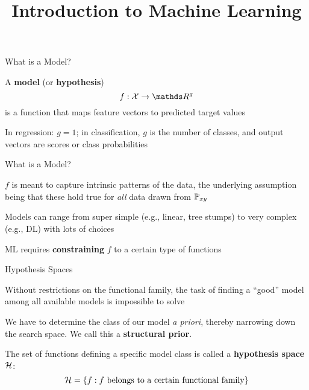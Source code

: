 \documentclass[11pt,compress,t,notes=noshow, xcolor=table]{beamer}
\title{Introduction to Machine Learning}
\begin{document}


\begin{framei}{What is a Model?}
\item A \textbf{model} (or \textbf{hypothesis}) 
$$
f : \Xspace \rightarrow \R^g
$$ 
is a function that maps feature vectors to predicted target values
\item In regression: $g = 1$; in classification, $g$ is the number of classes, and output vectors are scores or class probabilities
\end{framei}


\begin{framei}{What is a Model?}
\item $f$ is meant to capture intrinsic patterns of the data, the underlying assumption being that these hold true for \emph{all} data drawn from $\mathbb{P}_{xy}$
\item Models can range from super simple (e.g., linear, tree stumps) to very complex (e.g., DL) with lots of choices
\vfill
{}
\item ML requires \textbf{constraining} $f$ to a certain type of functions
\end{framei}


\begin{framei}[sep=L]{Hypothesis Spaces}
\item Without restrictions on the functional family, the task of finding a \enquote{good} model among all available models is impossible to solve
\item We have to determine the class of our model \emph{a priori}, thereby narrowing down the search space. We call this a \textbf{structural prior}.
\item The set of functions defining a specific model class is called a 
\textbf{hypothesis space} $\mathcal{H}$:
$$\mathcal{H} = \{f: f \text{ belongs to a certain functional family}\}$$
\end{framei}
\end{document}
